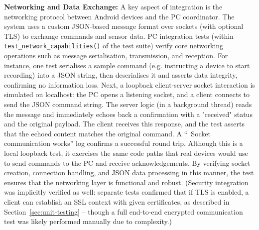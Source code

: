 \textbf{Networking and Data Exchange:} A key aspect of integration is the networking protocol between Android devices and the PC coordinator. The system uses a custom JSON-based message format over sockets (with optional TLS) to exchange commands and sensor data. PC integration tests (within \texttt{test\_network\_capabilities()} of the test suite) verify core networking operations such as message serialisation, transmission, and reception. For instance, one test serialises a sample command (e.g. instructing a device to start recording) into a JSON string, then deserialises it and asserts data integrity, confirming no information loss. Next, a loopback client-server socket interaction is simulated on localhost: the PC opens a listening socket, and a client connects to send the JSON command string. The server logic (in a background thread) reads the message and immediately echoes back a confirmation with a "received" status and the original payload. The client receives this response, and the test asserts that the echoed content matches the original command. A ``\checkmark\ Socket communication works'' log confirms a successful round trip. Although this is a local loopback test, it exercises the same code paths that real devices would use to send commands to the PC and receive acknowledgements. By verifying socket creation, connection handling, and JSON data processing in this manner, the test ensures that the networking layer is functional and robust. (Security integration was implicitly verified as well: separate tests confirmed that if TLS is enabled, a client can establish an SSL context with given certificates, as described in Section~\ref{sec:unit-testing} -- though a full end-to-end encrypted communication test was likely performed manually due to complexity.)

